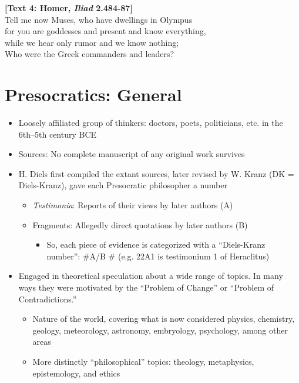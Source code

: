 \documentclass[11pt]{article}
\begin{document}
\vspace*{1mm}

\noindent \textbf{[Text 4: Homer, \emph{Iliad} 2.484-87]}\\Tell me now Muses, who have dwellings in Olympus\\for you are goddesses and present and know everything,\\while we hear only rumor and we know nothing;\\Who were the Greek commanders and leaders?

\section*{Presocratics: General}

\begin{itemize}\item{Loosely affiliated group of thinkers: doctors, poets, politicians, etc. in the 6th--5th century BCE}

\item{Sources: No complete manuscript of any original work survives}

\item{H. Diels first compiled the extant sources, later revised by W. Kranz (DK = Diels-Kranz), gave each Presocratic philosopher a number}
\begin{itemize}\item{\emph{Testimonia}: Reports of their views by later authors (A)}\item{Fragments: Allegedly direct quotations by later authors (B)}\begin{itemize}\item{So, each piece of evidence is categorized with a ``Diels-Kranz number'': \#A/B \# (e.g. 22A1 is testimonium 1 of Heraclitus)}\end{itemize}\end{itemize}

\item{Engaged in theoretical speculation about a wide range of topics. In many ways they were motivated by the ``Problem of Change'' or ``Problem of Contradictions.''} \begin{itemize}\item{Nature of the world, covering what is now considered physics, chemistry, geology, meteorology, astronomy, embryology, psychology, among other areas}\item{More distinctly ``philosophical'' topics: theology, metaphysics, epistemology, and ethics}\end{itemize}

\end{itemize}
\end{document}
